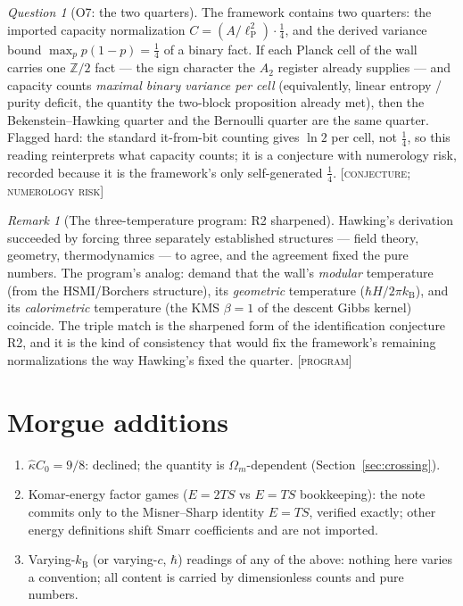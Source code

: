 \documentclass[11pt,reqno]{amsart}
\numberwithin{equation}{section}
\theoremstyle{definition}
\theoremstyle{remark}
\newtheorem{remark}[theorem]{Remark}
\newtheorem{question}[theorem]{Question}
\newcommand{\slab}[1]{\textup{[\textsc{#1}]}}
\newcommand{\lP}{\ell_{\mathrm P}}
\newcommand{\kB}{k_{\mathrm B}}
\begin{document}
\begin{question}[O7: the two quarters]\label{q:O7}
The framework contains two quarters: the imported capacity normalization
$C=(A/\lP^2)\cdot\tfrac14$, and the derived variance bound
$\max_p p(1-p)=\tfrac14$ of a binary fact. If each Planck cell of the
wall carries one $\mathbb Z/2$ fact --- the sign character the $A_2$
register already supplies \cite{Ruble2026b} --- and capacity counts
\emph{maximal binary variance per cell} (equivalently, linear entropy /
purity deficit, the quantity the two-block proposition already met),
then the Bekenstein--Hawking quarter and the Bernoulli quarter are the
same quarter. Flagged hard: the standard it-from-bit counting gives
$\ln2$ per cell, not $\tfrac14$, so this reading reinterprets what
capacity counts; it is a conjecture with numerology risk, recorded
because it is the framework's only self-generated $\tfrac14$.
\slab{conjecture; numerology risk}
\end{question}

\begin{remark}[The three-temperature program: R2 sharpened]
Hawking's derivation succeeded by forcing three separately established
structures --- field theory, geometry, thermodynamics --- to agree, and
the agreement fixed the pure numbers. The program's analog: demand that
the wall's \emph{modular} temperature (from the HSMI/Borchers structure),
its \emph{geometric} temperature ($\hbar H/2\pi\kB$), and its
\emph{calorimetric} temperature (the KMS $\beta=1$ of the descent Gibbs
kernel) coincide. The triple match is the sharpened form of the
identification conjecture R2, and it is the kind of consistency that
would fix the framework's remaining normalizations the way Hawking's
fixed the quarter. \slab{program}
\end{remark}

\section{Morgue additions}\label{sec:morgue}

\begin{enumerate}[label=\textbf{M\arabic*.},leftmargin=3em,start=5]
\item $\hat\kappa C_0=9/8$: declined; the quantity is
$\Omega_m$-dependent (Section~\ref{sec:crossing}).
\item Komar-energy factor games ($E=2TS$ vs $E=TS$ bookkeeping): the
note commits only to the Misner--Sharp identity $E=TS$, verified
exactly; other energy definitions shift Smarr coefficients and are not
imported.
\item Varying-$\kB$ (or varying-$c$, $\hbar$) readings of any of the
above: nothing here varies a convention; all content is carried by
dimensionless counts and pure numbers.
\end{enumerate}
\end{document}
